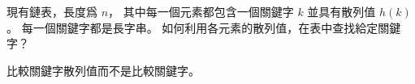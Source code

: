 \startEXERCISE
現有鏈表，長度爲 $n$，
其中每一個元素都包含一個關鍵字 $k$ 並具有散列值 $h(k)$。
每一個關鍵字都是長字串。
如何利用各元素的散列值，在表中查找給定關鍵字？
\stopEXERCISE

\startANSWER
比較關鍵字散列值而不是比較關鍵字。
\stopANSWER
